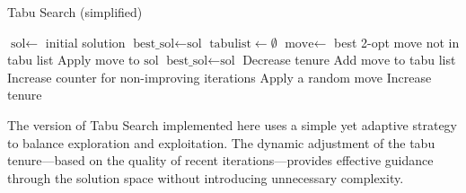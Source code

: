 \begin{algorithm}
\caption{Tabu Search (simplified)}
\begin{algorithmic}
    \State $\text{sol} \gets$ initial solution
    \State $\text{best\_sol} \gets \text{sol}$
    \State $\text{tabulist} \gets \emptyset$
        \State $\text{move} \gets$ best 2-opt move not in tabu list
        \State Apply $\text{move}$ to $\text{sol}$
            \State $\text{best\_sol} \gets \text{sol}$
                \State Decrease tenure
            \EndIf
        \Else
            \State Add $\text{move}$ to tabu list
            \State Increase counter for non-improving iterations
        \EndIf
            \State Apply a random move
                \State Increase tenure
            \EndIf
        \EndIf
    \EndWhile
\end{algorithmic}
\end{algorithm}

The version of Tabu Search implemented here uses a simple yet adaptive strategy to balance exploration and exploitation. 
The dynamic adjustment of the tabu tenure—based on the quality of recent iterations—provides effective guidance through the solution space 
without introducing unnecessary complexity.